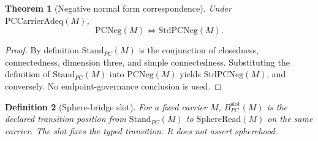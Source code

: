\documentclass[11pt]{article}
\newtheorem{theorem}{Theorem}[section]
\newtheorem{definition}[theorem]{Definition}
\newcommand{\StandPC}{\mathrm{Stand}_{PC}}
\newcommand{\SphereRead}{\mathrm{SphereRead}}
\newcommand{\PCNeg}{\mathrm{PCNeg}}
\newcommand{\StdPCNeg}{\mathrm{StdPCNeg}}
\newcommand{\BridgeSlotPC}{B^{\mathrm{slot}}_{PC}}
\begin{document}
\begin{theorem}[Negative normal form correspondence]\label{thm:pcneg-normal-form}
Under \(\mathrm{PCCarrierAdeq}(M)\),
\[
\PCNeg(M)\Longleftrightarrow \StdPCNeg(M).
\]
\end{theorem}
\begin{proof}
By definition \(\StandPC(M)\) is the conjunction of closedness, connectedness, dimension three, and simple connectedness. Substituting the definition of \(\StandPC(M)\) into \(\PCNeg(M)\) yields \(\StdPCNeg(M)\), and conversely. No endpoint-governance conclusion is used.
\end{proof}

\begin{definition}[Sphere-bridge slot]
For a fixed carrier \(M\), \(\BridgeSlotPC(M)\) is the declared transition position from \(\StandPC(M)\) to \(\SphereRead(M)\) on the same carrier. The slot fixes the typed transition. It does not assert spherehood.
\end{definition}
\end{document}
